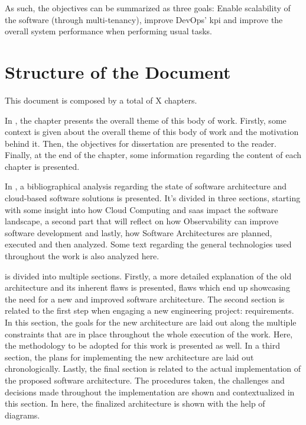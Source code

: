 As such, the objectives can be summarized as three goals: Enable scalability of the software (through multi-tenancy), improve DevOps' \gls{kpi} and improve the overall system performance when performing usual tasks.


\section{Structure of the Document}\label{intro:s:structure-of-the-document}

This document is composed by a total of X chapters.

In , the chapter presents the overall theme of this body of work. Firstly, some context is given about the overall theme of this body of work and the motivation behind it. Then, the objectives for dissertation are presented to the reader. Finally, at the end of the chapter, some information regarding the content of each chapter is presented.

In , a bibliographical analysis regarding the state of software architecture and cloud-based software solutions is presented. It’s divided in three sections, starting with some insight into how Cloud Computing and \gls{saas} impact the software landscape, a second part that will reflect on how Observability can improve software development and lastly,  how Software Architectures are planned, executed and then analyzed. Some text regarding the general technologies used throughout the work is also analyzed here.

 is divided into multiple sections. Firstly, a more detailed explanation of the old architecture and its inherent flaws is presented, flaws which end up showcasing the need for a new and improved software architecture. The second section is related to the first step when engaging a new engineering project: requirements. In this section, the goals for the new architecture are laid out along the multiple constraints that are in place throughout the whole execution of the work. Here, the methodology to be adopted for this work is presented as well. In a third section, the plans for implementing the new architecture are laid out chronologically. Lastly, the final section is related to the actual implementation of the proposed software architecture. The procedures taken, the challenges and decisions made throughout the implementation are shown and contextualized in this section. In here, the finalized architecture is shown with the help of diagrams. 

